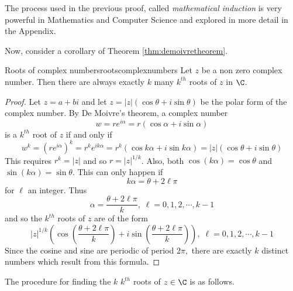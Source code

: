 The process used in the previous proof, called {\em mathematical
induction\em} is very powerful in Mathematics and Computer Science
and explored in more detail in the Appendix.

Now, consider a corollary of Theorem \ref{thm:demoivretheorem}.

\begin{corollary}{Roots of complex numbers}{rootscomplexnumbers}
Let $z$ be a non zero complex number.
Then there are always exactly $k$ many  $k^{th}$
roots of $z$ in $\C$.
\end{corollary}

\begin{proof}
Let $z=a+bi$ and let $z=\left\vert z\right\vert \left( \cos
\theta+i\sin \theta\right) $ be the polar form of the complex number. By De Moivre's
theorem, a complex number
\begin{equation*}
w= r e^{i \alpha} = r\left( \cos \alpha +i\sin \alpha \right) 
\end{equation*}
is a $k^{th}$ root of $z$ if and only if
\begin{equation*}
w^k = (r e^{i \alpha})^k = r^k e^{ik\alpha} = r^{k}\left( \cos k\alpha +i\sin k\alpha \right) =\left\vert z\right\vert
\left( \cos \theta+i\sin \theta\right) 
\end{equation*}
This requires $r^{k}=\left\vert z\right\vert $ and so $r=\left\vert
z\right\vert ^{1/k}$. Also, both $\cos \left( k\alpha \right) =\cos \theta$ and
$\sin \left( k\alpha \right) =\sin \theta.$ This can only happen if
\begin{equation*}
k\alpha =\theta+2 \ell \pi
\end{equation*}
for $\ell$ an integer. Thus
\begin{equation*}
\alpha =
\frac{\theta+2 \ell \pi }{k},\; \ell = 0, 1, 2, \cdots, k-1 
\end{equation*}
and so the $k^{th}$ roots of $z$ are of the form
\begin{equation*}
\left\vert z\right\vert ^{1/k}\left( \cos \left( \frac{\theta+2 \ell \pi }{k}\right)
+i\sin \left( \frac{\theta+2 \ell \pi }{k}\right) \right) ,\;\ell = 0, 1, 2, \cdots, k-1 
\end{equation*}
Since the cosine and sine are periodic of period $2\pi ,$ there are exactly $
k$ distinct numbers which result from this formula. 
\end{proof}

The procedure for finding the $k$ $k^{th}$ roots of $z \in \C$ is as follows.

